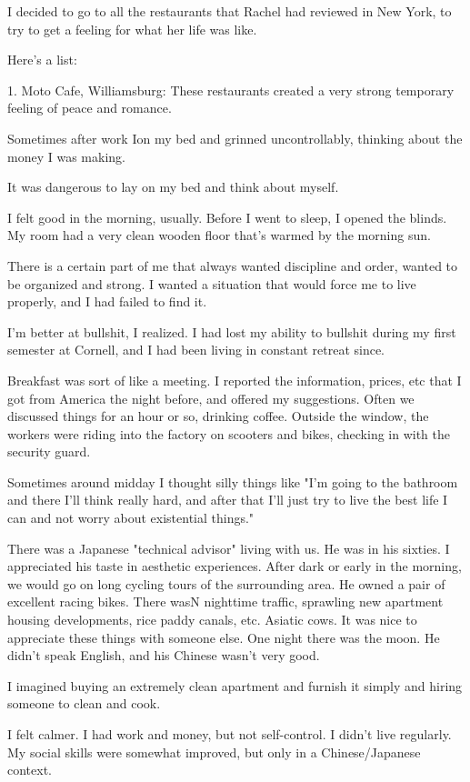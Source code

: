 I decided to go to all the restaurants that Rachel had reviewed in New York, to
try to get a feeling for what her life was like.

Here's a list:

1. Moto Cafe, Williamsburg:
These restaurants created a very strong temporary feeling of peace and romance.

Sometimes after work Ion my bed and grinned uncontrollably, thinking about
the money I was making.

It was dangerous to lay on my bed and think about myself.

I felt good in the morning, usually. Before I went to sleep, I opened the
blinds. My room had a very clean wooden floor that's warmed by the morning sun.

There is a certain part of me that always wanted discipline and order,
wanted to be organized and strong. I wanted a situation that would force me
to live properly, and I had failed to find it.

I'm better at bullshit, I realized. I had lost my ability to bullshit during my
first semester at Cornell, and I had been living in constant retreat since.

Breakfast was sort of like a meeting. I reported the information, prices, etc
that I got from America the night before, and offered my suggestions. Often we
discussed things for an hour or so, drinking coffee. Outside the window, the
workers were riding into the factory on scooters and bikes, checking in with the
security guard.

Sometimes around midday I thought silly things like "I'm going to the bathroom
and there I'll think really hard, and after that I'll just try to live the best
life I can and not worry about existential things."

There was a Japanese "technical advisor" living with us. He was in his sixties.
I appreciated his taste in aesthetic experiences.  After dark or early in the
morning, we would go on long cycling tours of the surrounding area. He owned a
pair of excellent racing bikes.  There wasN nighttime traffic, sprawling new
apartment housing developments, rice paddy canals, etc.  Asiatic cows.   It was
nice to appreciate these things with someone else.  One night there was the
moon.  He didn't speak English, and his Chinese wasn't very good.

I imagined buying an extremely clean apartment and furnish it simply and hiring
someone to clean and cook.

I felt calmer.  I had work and money, but not self-control.  I didn't live
regularly.  My social skills were somewhat improved, but only in a
Chinese/Japanese context.

